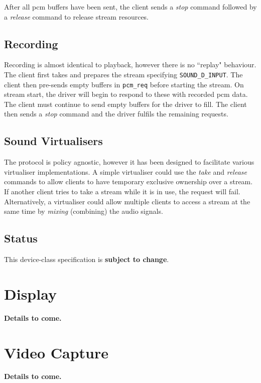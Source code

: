 \documentclass[a4paper,12pt]{report}
\newcommand{\ToCome}[1]{\textbf{#1 to come.}}
\newcommand{\code}[1]{\texttt{#1}}
\begin{document}
After all \gls{pcm} buffers have been sent, the client sends a \textit{stop} command
followed by a \textit{release} command to release stream resources.

\subsection{Recording}

Recording is almost identical to playback, however there is no ``replay"
behaviour. The client first takes and prepares the stream specifying
\code{SOUND\_D\_INPUT}.  The client then pre-sends empty buffers in
\code{pcm\_req} before starting the stream. On stream start, the driver will
begin to respond to these with recorded \gls{pcm} data. The client must continue to
send empty buffers for the driver to fill. The client then sends a \textit{stop}
command and the driver fulfils the remaining requests.

\subsection{Sound Virtualisers}

The protocol is policy agnostic, however it has been designed to facilitate
various virtualiser implementations. A simple virtualiser could use the
\textit{take} and \textit{release} commands to allow clients to have temporary
exclusive ownership over a stream. If another client tries to take a stream
while it is in use, the request will fail. Alternatively, a virtualiser could
allow multiple clients to access a stream at the same time by \textit{mixing}
(combining) the audio signals.


\subsection{Status}

This device-class specification is \textbf{subject to change}.

\section{Display}\label{s:cl-display}

\ToCome{Details}

\section{Video Capture}\label{s:cl-camera}

\ToCome{Details}
\end{document}
